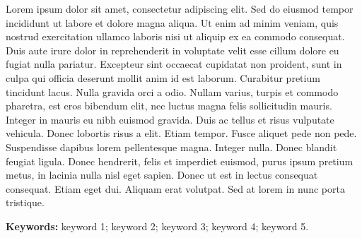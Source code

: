 Lorem ipsum dolor sit amet, consectetur adipiscing elit. Sed do eiusmod tempor incididunt ut labore et dolore magna aliqua. Ut enim ad minim veniam, quis nostrud exercitation ullamco laboris nisi ut aliquip ex ea commodo consequat. Duis aute irure dolor in reprehenderit in voluptate velit esse cillum dolore eu fugiat nulla pariatur. Excepteur sint occaecat cupidatat non proident, sunt in culpa qui officia deserunt mollit anim id est laborum. Curabitur pretium tincidunt lacus. Nulla gravida orci a odio. Nullam varius, turpis et commodo pharetra, est eros bibendum elit, nec luctus magna felis sollicitudin mauris. Integer in mauris eu nibh euismod gravida. Duis ac tellus et risus vulputate vehicula. Donec lobortis risus a elit. Etiam tempor. Fusce aliquet pede non pede. Suspendisse dapibus lorem pellentesque magna. Integer nulla. Donec blandit feugiat ligula. Donec hendrerit, felis et imperdiet euismod, purus ipsum pretium metus, in lacinia nulla nisl eget sapien. Donec ut est in lectus consequat consequat. Etiam eget dui. Aliquam erat volutpat. Sed at lorem in nunc porta tristique.\par
\vspace{\baselineskip}

\textbf{Keywords:} keyword 1; keyword 2; keyword 3; keyword 4; keyword 5.
\endgroup
